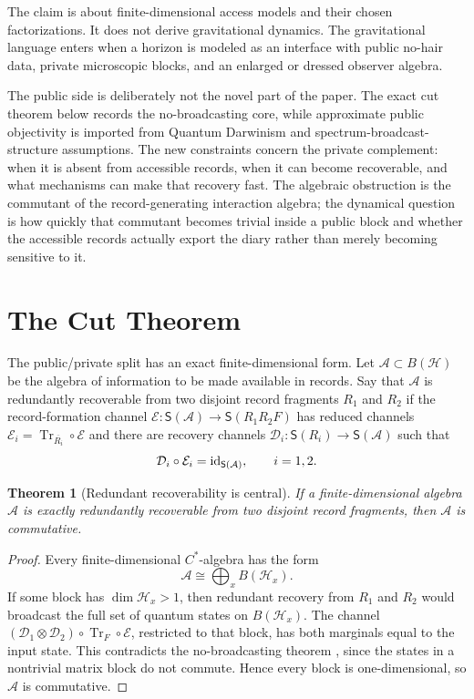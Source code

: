 \documentclass[11pt]{article}
\newtheorem{theorem}{Theorem}
\newcommand{\cH}{\mathcal H}
\newcommand{\cA}{\mathcal A}
\newcommand{\cD}{\mathcal D}
\newcommand{\cE}{\mathcal E}
\newcommand{\Tr}{\operatorname{Tr}}
\begin{document}
The claim is about finite-dimensional access models and their chosen
factorizations.  It does not derive gravitational dynamics.  The
gravitational language enters when a horizon is modeled as an interface
with public no-hair data, private microscopic blocks, and an enlarged or
dressed observer algebra.

The public side is deliberately not the novel part of the paper.  The
exact cut theorem below records the no-broadcasting core, while
approximate public objectivity is imported from Quantum Darwinism and
spectrum-broadcast-structure assumptions.  The new constraints concern
the private complement: when it is absent from accessible records, when
it can become recoverable, and what mechanisms can make that recovery
fast.  The algebraic obstruction is the commutant of the
record-generating interaction algebra; the dynamical question is how
quickly that commutant becomes trivial inside a public block and whether
the accessible records actually export the diary rather than merely
becoming sensitive to it.

\section{The Cut Theorem}

The public/private split has an exact finite-dimensional form.  Let
$\cA\subset B(\cH)$ be the algebra of information to be made available
in records.  Say that $\cA$ is redundantly recoverable from two disjoint
record fragments $R_1$ and $R_2$ if the record-formation channel
$\cE:\mathsf S(\cA)\to \mathsf S(R_1R_2F)$ has reduced channels
$\cE_i=\Tr_{\overline{R_i}}\circ\cE$ and there are recovery channels
$\cD_i:\mathsf S(R_i)\to\mathsf S(\cA)$ such that
\begin{equation}
  \cD_i\circ \cE_i = {\rm id}_{\mathsf S(\cA)},
  \qquad i=1,2 .
\end{equation}

\begin{theorem}[Redundant recoverability is central]
\label{thm:cut}
If a finite-dimensional algebra $\cA$ is exactly redundantly recoverable
from two disjoint record fragments, then $\cA$ is commutative.
\end{theorem}

\begin{proof}
Every finite-dimensional $C^*$-algebra has the form
\begin{equation}
  \cA \cong \bigoplus_x B(\cH_x).
\end{equation}
If some block has $\dim \cH_x>1$, then redundant recovery from $R_1$ and
$R_2$ would broadcast the full set of quantum states on $B(\cH_x)$.  The
channel $(\cD_1\otimes\cD_2)\circ\Tr_F\circ\cE$, restricted to that
block, has both marginals equal to the input state.  This contradicts
the no-broadcasting theorem \citep{Barnum1996NoBroadcasting}, since the
states in a nontrivial matrix block do not commute.  Hence every block
is one-dimensional, so $\cA$ is commutative.
\end{proof}
\end{document}
